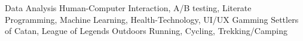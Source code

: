 \begin{cvinterests}
  \cvskill
    {Data Analysis}
    {Human-Computer Interaction, A/B testing, Literate Programming, Machine Learning, Health-Technology, UI/UX}
  \cvskill
    {Gamming}
    {Settlers of Catan, League of Legends}
  \cvskill
    {Outdoors}
    {Running, Cycling, Trekking/Camping}
\end{cvinterests}
